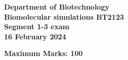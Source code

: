 \documentclass{exam}
\begin{document}
\newcommand\ddfrac[2]{\frac{\displaystyle #1}{\displaystyle #2}}

\begin{center}
  \bfseries\large
  Department of Biotechnology\\
 Biomolecular simulations  BT2123\\
 Segment 1-3 exam \\
16 February 2024 \\ 

\begin{flushright} \textbf{Maximum Marks: 100} \end{flushright} 

 \bigskip
{}
\end{center}
\vspace{3mm}
\end{document}
